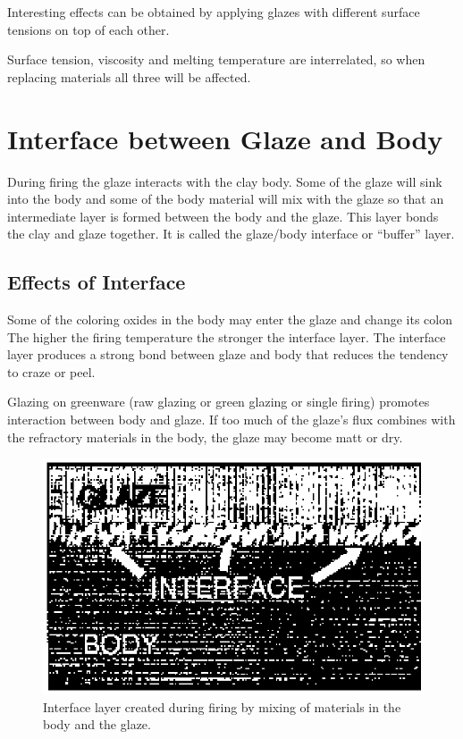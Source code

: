 Interesting effects can be obtained by applying glazes with different surface 
tensions on top of each other.

Surface tension, viscosity and melting temperature are interrelated, so when 
replacing materials all three will be affected.
\section{Interface between Glaze and Body}
During firing the glaze interacts with the clay body. Some of the glaze will 
sink into the body and some of the body material will mix with the glaze so 
that an intermediate layer is formed between the body and the glaze. This layer 
bonds the clay and glaze together. It is called the glaze/body interface or 
``buffer'' layer.
\subsection{Effects of Interface}
Some of the coloring oxides in the body may enter the glaze and change its 
colon The higher the firing temperature the stronger the interface layer. The 
interface layer produces a strong bond between glaze and body that reduces the 
tendency to craze or peel.

Glazing on greenware (raw glazing or green glazing or single firing) promotes 
interaction between body and glaze. If too much of the glaze's flux combines 
with the refractory materials in the body, the glaze may become matt or dry.
\begin{figure}[htbp!]
  \centering
  \includegraphics[width=0.8\linewidth]{img/interface.eps}
  \caption{Interface layer created during firing by mixing of materials in the 
  body and the glaze.}
  \label{fig:interface}
\end{figure}
